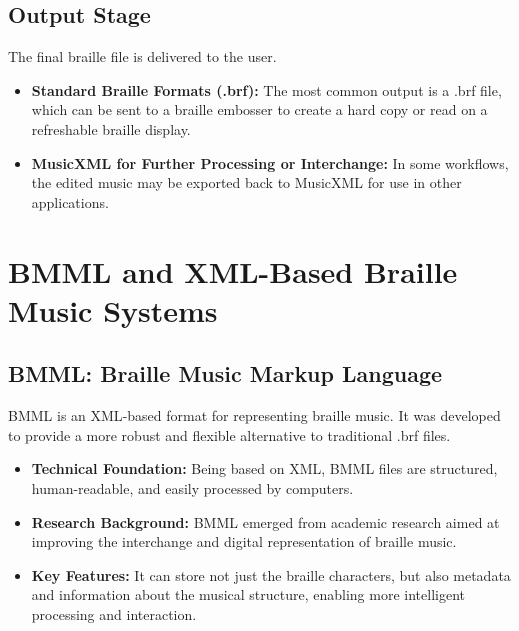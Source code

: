 \subsection{Output Stage}\label{ch10:ssec:output-stage}
The final braille file is delivered to the user.
\begin{itemize}
	\item \textbf{Standard Braille Formats (.brf):} The most common output is a .brf file, which can be sent to a braille embosser to create a hard copy or read on a refreshable braille display.
	\item \textbf{MusicXML for Further Processing or Interchange:} In some workflows, the edited music may be exported back to \gls{MusicXML} for use in other applications.
\end{itemize}

\section{BMML and XML-Based Braille Music Systems}\label{ch10:sec:bmml-xml-systems}

\subsection{BMML: Braille Music Markup Language}\label{ch10:ssec:bmml}
\gls{BMML} is an \gls{XML}-based format for representing braille music. It was developed to provide a more robust and flexible alternative to traditional .brf files.
\begin{itemize}
	\item \textbf{Technical Foundation:} Being based on \gls{XML}, \gls{BMML} files are structured, human-readable, and easily processed by computers.
	\item \textbf{Research Background:} \gls{BMML} emerged from academic research aimed at improving the interchange and digital representation of braille music.
	\item \textbf{Key Features:} It can store not just the braille characters, but also metadata and information about the musical structure, enabling more intelligent processing and interaction.
\end{itemize}


